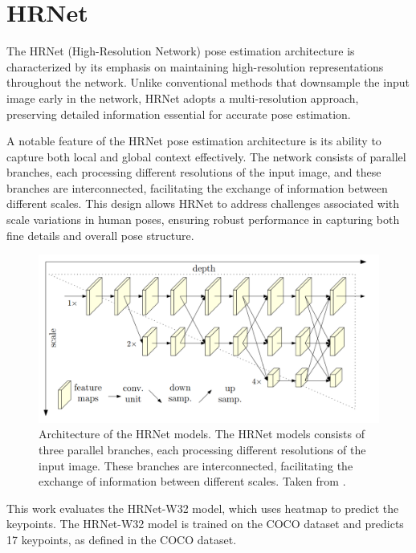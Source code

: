 \section{HRNet}

The HRNet (High-Resolution Network) \cite{hrnet} pose estimation architecture is characterized by its emphasis on maintaining high-resolution representations throughout the network. Unlike conventional methods that downsample the input image early in the network, HRNet adopts a multi-resolution approach, preserving detailed information essential for accurate pose estimation.

A notable feature of the HRNet pose estimation architecture is its ability to capture both local and global context effectively. The network consists of parallel branches, each processing different resolutions of the input image, and these branches are interconnected, facilitating the exchange of information between different scales. This design allows HRNet to address challenges associated with scale variations in human poses, ensuring robust performance in capturing both fine details and overall pose structure.

\begin{figure}[htbp]
    \centering
    \includegraphics[width=\textwidth]{obrazky-figures/hrnet_architecture.png}
    \caption{Architecture of the HRNet models. The HRNet models consists of three parallel branches, each processing different resolutions of the input image. These branches are interconnected, facilitating the exchange of information between different scales. Taken from \cite{hrnet}.}
    \label{fig:hrnet_architecture}
\end{figure}

This work evaluates the HRNet-W32 model, which uses heatmap to predict the keypoints. The HRNet-W32 model is trained on the COCO dataset and predicts 17 keypoints, as defined in the COCO dataset.


